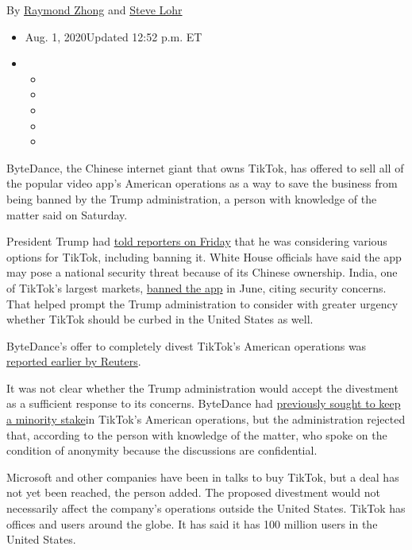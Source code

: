 By \href{https://www.nytimes.com/by/raymond-zhong}{Raymond Zhong} and
\href{https://www.nytimes.com/by/steve-lohr}{Steve Lohr}

\begin{itemize}
\item
  Aug. 1, 2020Updated 12:52 p.m. ET
\item
  \begin{itemize}
  \item
  \item
  \item
  \item
  \item
  \end{itemize}
\end{itemize}

ByteDance, the Chinese internet giant that owns TikTok, has offered to
sell all of the popular video app's American operations as a way to save
the business from being banned by the Trump administration, a person
with knowledge of the matter said on Saturday.

President Trump had
\href{https://www.nytimes.com/2020/07/31/technology/tiktok-microsoft.html}{told
reporters on Friday} that he was considering various options for TikTok,
including banning it. White House officials have said the app may pose a
national security threat because of its Chinese ownership. India, one of
TikTok's largest markets,
\href{https://www.nytimes.com/2020/06/30/technology/india-china-tiktok.html}{banned
the app} in June, citing security concerns. That helped prompt the Trump
administration to consider with greater urgency whether TikTok should be
curbed in the United States as well.

ByteDance's offer to completely divest TikTok's American operations was
\href{https://www.reuters.com/article/us-usa-tiktok-bytedance-exclusive-idUSKBN24X3SK}{reported
earlier by Reuters}.

It was not clear whether the Trump administration would accept the
divestment as a sufficient response to its concerns. ByteDance had
\href{https://www.nytimes.com/2020/07/23/business/dealbook/tiktok-bytedance-investors-trump.html?searchResultPosition=2}{previously
sought to keep a minority stake}in TikTok's American operations, but the
administration rejected that, according to the person with knowledge of
the matter, who spoke on the condition of anonymity because the
discussions are confidential.

Microsoft and other companies have been in talks to buy TikTok, but a
deal has not yet been reached, the person added. The proposed divestment
would not necessarily affect the company's operations outside the United
States. TikTok has offices and users around the globe. It has said it
has 100 million users in the United States.


